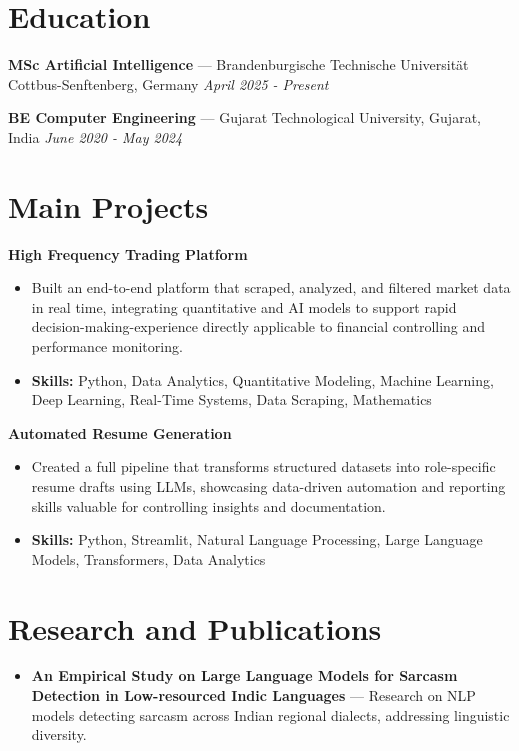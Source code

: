 \documentclass[a4paper,10pt]{article}
\begin{document}
\section*{Education}
\textbf{MSc Artificial Intelligence} — Brandenburgische Technische Universität Cottbus-Senftenberg, Germany \hfill \textit{April 2025 - Present}\par
\vspace{1.5pt}
\textbf{BE Computer Engineering} — Gujarat Technological University, Gujarat, India \hfill \textit{June 2020 - May 2024}\par

\section*{Main Projects}
\textbf{High Frequency Trading Platform}\par
\vspace{1pt}
\begin{itemize}
  \item Built an end-to-end platform that scraped, analyzed, and filtered market data in real time, integrating quantitative and AI models to support rapid decision-making-experience directly applicable to financial controlling and performance monitoring.
  \item \textbf{Skills:} Python, Data Analytics, Quantitative Modeling, Machine Learning, Deep Learning, Real-Time Systems, Data Scraping, Mathematics
\end{itemize}
\vspace{3pt}
\textbf{Automated Resume Generation}\par
\vspace{1pt}
\begin{itemize}
  \item Created a full pipeline that transforms structured datasets into role-specific resume drafts using LLMs, showcasing data-driven automation and reporting skills valuable for controlling insights and documentation.
  \item \textbf{Skills:} Python, Streamlit, Natural Language Processing, Large Language Models, Transformers, Data Analytics
\end{itemize}

\section*{Research and Publications}
\begin{itemize}
\item \textbf{An Empirical Study on Large Language Models for Sarcasm Detection in Low-resourced Indic Languages} — Research on NLP models detecting sarcasm across Indian regional dialects, addressing linguistic diversity.
\end{itemize}
\end{document}
